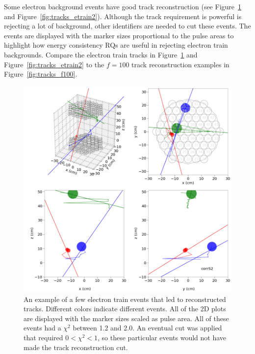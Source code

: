 Some electron background events have good track reconstruction (see Figure~\ref{fig:tracks_etrain} and Figure~\ref{fig:tracks_etrain2}). Although the track requirement is powerful is rejecting a lot of background, other identifiers are needed to cut these events. The events are displayed with the marker sizes proportional to the pulse areas to highlight how energy consistency \ac{RQ}s are useful in rejecting electron train backgrounds. Compare the electron train tracks in Figure~\ref{fig:tracks_etrain} and Figure~\ref{fig:tracks_etrain2} to the $f=100$ track reconstruction examples in Figure~\ref{fig:tracks_f100}. 

\begin{figure}[htbp]
\begin{center}
\includegraphics[width=\textwidth]{figures/lips/tracks_etrain.png}
\caption{An example of a few electron train events that led to reconstructed tracks. Different colors indicate different events. All of the 2D plots are displayed with the marker sizes scaled as pulse area. All of these events had a $\chi^{2}$ between 1.2 and 2.0. An eventual cut was applied that required $0 < \chi^{2} < 1$, so these particular events would not have made the track reconstruction cut. }
\label{fig:tracks_etrain}
\end{center}
\end{figure}

